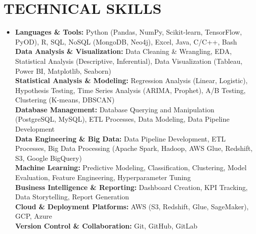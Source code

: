 \documentclass[letterpaper,11pt]{article}
\begin{document}
\section{\textbf{TECHNICAL SKILLS}}
\vspace{-3pt} %
\begin{itemize}[leftmargin=0.15in, label={}]
    \item \small{
        \textbf{Languages \& Tools:} Python (Pandas, NumPy, Scikit-learn, TensorFlow, PyOD), R, SQL, NoSQL (MongoDB, Neo4j), Excel, Java, C/C++, Bash \\
        \textbf{Data Analysis \& Visualization:} Data Cleaning \& Wrangling, EDA, Statistical Analysis (Descriptive, Inferential), Data Visualization (Tableau, Power BI, Matplotlib, Seaborn) \\
        \textbf{Statistical Analysis \& Modeling:} Regression Analysis (Linear, Logistic), Hypothesis Testing, Time Series Analysis (ARIMA, Prophet), A/B Testing, Clustering (K-means, DBSCAN) \\
        \textbf{Database Management:} Database Querying and Manipulation (PostgreSQL, MySQL), ETL Processes, Data Modeling, Data Pipeline Development \\
        \textbf{Data Engineering \& Big Data:} Data Pipeline Development, ETL Processes, Big Data Processing (Apache Spark, Hadoop, AWS Glue, Redshift, S3, Google BigQuery) \\
        \textbf{Machine Learning:} Predictive Modeling, Classification, Clustering, Model Evaluation, Feature Engineering, Hyperparameter Tuning \\
        \textbf{Business Intelligence \& Reporting:} Dashboard Creation, KPI Tracking, Data Storytelling, Report Generation \\
        \textbf{Cloud \& Deployment Platforms:} AWS (S3, Redshift, Glue, SageMaker), GCP, Azure \\
        \textbf{Version Control \& Collaboration:} Git, GitHub, GitLab
    }
\end{itemize}


\end{document}
